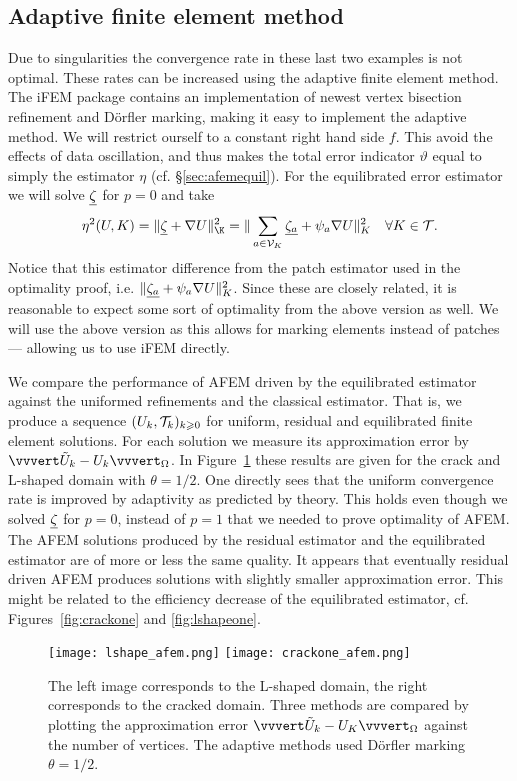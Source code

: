 \documentclass[thesis.tex]{subfiles}
\begin{document}
\subsection{Adaptive finite element method}
Due to singularities the convergence rate in these last two examples is not optimal. 
These rates can be increased using the adaptive finite element method. The iFEM package contains
an implementation of newest vertex bisection refinement and D\"orfler marking, making it easy
to implement the adaptive method. We will restrict ourself to a constant right hand side $f$. This
avoid the effects of data oscillation, and thus makes the total error indicator $\vartheta$ equal to 
simply the estimator $\eta$ (cf. \S\ref{sec:afemequil}). For the equilibrated error estimator we will
solve $\underline{\zeta}$ for $p=0$ and take
\[
  \eta^2(U, K) = \uanorm{ \v{\zeta} + \nabla U}^2_{\K} = \uanorm{\sum_{a \in \V_K} \v{\zeta_a} + \psi_a \nabla U}^2_{K} \quad \forall K \in \T.
\]
Notice that this estimator difference from the patch estimator used in the optimality proof, i.e. $\| \underline{\zeta_a} + \psi_a \nabla U \|^2_K$.
Since these are closely related, it is reasonable to expect some sort of optimality from the above version as well. We will use
the above version as this allows for marking elements instead of patches --- allowing us to use iFEM directly. 

We compare the performance of AFEM driven by the equilibrated estimator against the uniformed refinements and the classical estimator.
That is, we produce a sequence $(U_k, \mathcal{T}_k)_{k\geqslant0}$ for  uniform, residual and equilibrated finite element solutions.
For each solution we measure its approximation error by $\uaenorm{\tilde U_k - U_k}_\O$. In  Figure~\ref{fig:afem} these results
are given for the crack and L-shaped domain with $\theta = 1/2$. One directly sees that the uniform convergence rate is improved 
by adaptivity as predicted by theory.
This holds even though we solved $\underline{\zeta}$ for $p=0$, instead of $p=1$ that we needed
to prove optimality of AFEM.  The AFEM solutions produced by the residual estimator and the equilibrated estimator
are of more or less the same quality. It appears that eventually residual driven AFEM produces solutions with slightly
smaller approximation error. This might be related to the efficiency decrease of the equilibrated estimator, cf. Figures~\ref{fig:crackone} and \ref{fig:lshapeone}.
\begin{figure}
  \texttt{[image: lshape\_afem.png]}
  \texttt{[image: crackone\_afem.png]}
  \caption{The left image corresponds to the L-shaped domain, the right corresponds to the cracked domain. Three methods are
  compared by plotting the approximation error $\uaenorm{\tilde U_k - U_K}_\O$ against the number of vertices. The adaptive methods
  used D\"orfler marking $\theta = 1/2$.}
  \label{fig:afem}
\end{figure}
\end{document}
